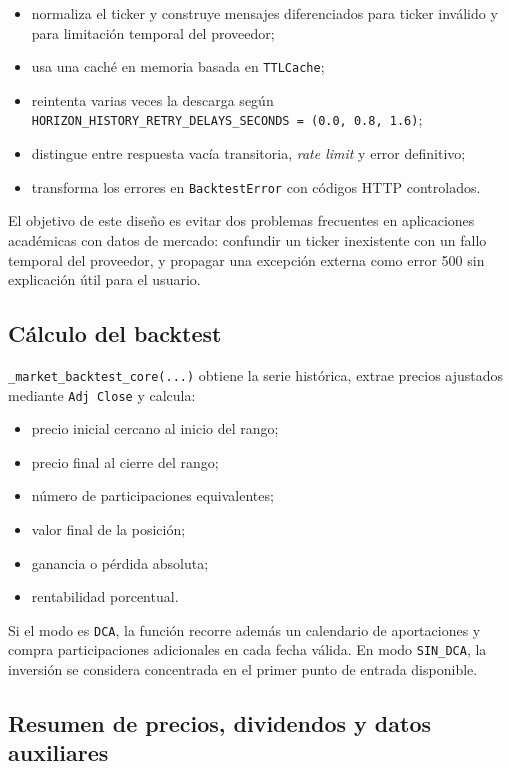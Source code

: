\begin{itemize}
    \item normaliza el ticker y construye mensajes diferenciados para ticker inválido y para limitación temporal del proveedor;
    \item usa una caché en memoria basada en \texttt{TTLCache};
    \item reintenta varias veces la descarga según \texttt{HORIZON\_HISTORY\_RETRY\_DELAYS\_SECONDS = (0.0, 0.8, 1.6)};
    \item distingue entre respuesta vacía transitoria, \textit{rate limit} y error definitivo;
    \item transforma los errores en \texttt{BacktestError} con códigos HTTP controlados.
\end{itemize}

El objetivo de este diseño es evitar dos problemas frecuentes en aplicaciones académicas con datos de mercado: confundir un ticker inexistente con un fallo temporal del proveedor, y propagar una excepción externa como error 500 sin explicación útil para el usuario.

\subsection{Cálculo del backtest}

\texttt{\_market\_backtest\_core(...)} obtiene la serie histórica, extrae precios ajustados mediante \texttt{Adj Close} y calcula:

\begin{itemize}
    \item precio inicial cercano al inicio del rango;
    \item precio final al cierre del rango;
    \item número de participaciones equivalentes;
    \item valor final de la posición;
    \item ganancia o pérdida absoluta;
    \item rentabilidad porcentual.
\end{itemize}

Si el modo es \texttt{DCA}, la función recorre además un calendario de aportaciones y compra participaciones adicionales en cada fecha válida. En modo \texttt{SIN\_DCA}, la inversión se considera concentrada en el primer punto de entrada disponible.

\subsection{Resumen de precios, dividendos y datos auxiliares}


